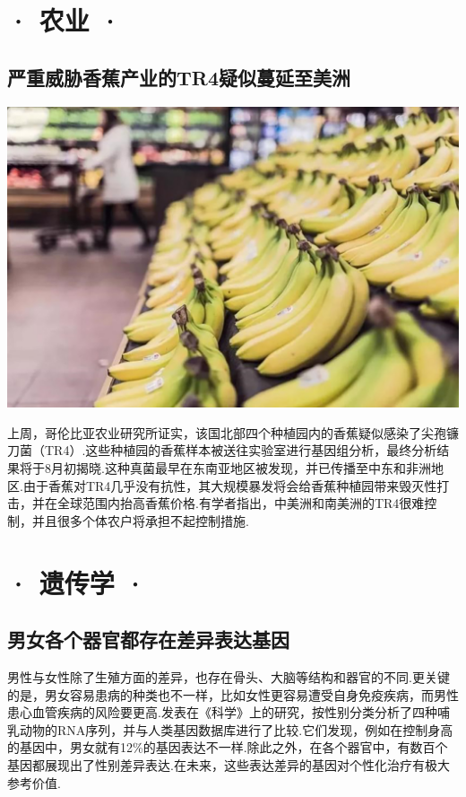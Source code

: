 \ADyixuehui
\newpage
{}
\begin{multicols}{2}
\section*{· 农业 ·}

\subsection*{严重威胁香蕉产业的TR4疑似蔓延至美洲}

{\centering\includegraphics[width=0.8\linewidth]{IMG/201907/09.jpg}\vskip0cm}

上周，哥伦比亚农业研究所证实，该国北部四个种植园内的香蕉疑似感染了尖孢镰刀菌（TR4）.这些种植园的香蕉样本被送往实验室进行基因组分析，最终分析结果将于8月初揭晓.这种真菌最早在东南亚地区被发现，并已传播至中东和非洲地区.由于香蕉对TR4几乎没有抗性，其大规模暴发将会给香蕉种植园带来毁灭性打击，并在全球范围内抬高香蕉价格.有学者指出，中美洲和南美洲的TR4很难控制，并且很多个体农户将承担不起控制措施.

\section*{· 遗传学 ·}

\subsection*{男女各个器官都存在差异表达基因}

男性与女性除了生殖方面的差异，也存在骨头、大脑等结构和器官的不同.更关键的是，男女容易患病的种类也不一样，比如女性更容易遭受自身免疫疾病，而男性患心血管疾病的风险要更高.发表在《科学》上的研究，按性别分类分析了四种哺乳动物的RNA序列，并与人类基因数据库进行了比较.它们发现，例如在控制身高的基因中，男女就有12\%的基因表达不一样.除此之外，在各个器官中，有数百个基因都展现出了性别差异表达.在未来，这些表达差异的基因对个性化治疗有极大参考价值.


\end{multicols}
